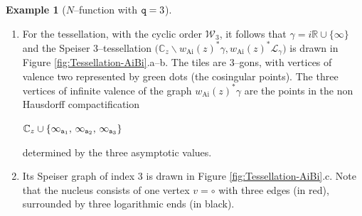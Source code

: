 \documentclass[final,3p,times]{elsarticle}
\newcommand{\CC}{\ensuremath{{\mathbb C}}}
\newcommand{\CW}{\ensuremath{{\widehat{\mathbb C}}}}
\newcommand{\RR}{\ensuremath{{\mathbb R}}}
\newcommand{\R}{\ensuremath{{\mathcal R}}}
\newcommand{\Ai}{{\text{Ai}}}
\theoremstyle{definition}
\newtheorem{example}{Example}[section]
\begin{document}
\begin{example}[$N$--function with ${\tt q}=3$]
\begin{enumerate}[label=\alph*),leftmargin=*]
\noindent
Clearly, we could have chosen different types of sheets in Equation \eqref{eq:eleccion-hojas}; 
for instance by choosing $\mathfrak{L}_3 =  \CW_w \backslash \overline{\infty\, -i}$, 
$\mathfrak{L}_1 = \CW_w \backslash \overline{i\, \infty\, -i}$ and 
$\mathfrak{L}_4 = \CW_w \backslash 
\big( \overline{i\, \infty\, -i} \cup  \overline{i \,  \infty} \cup 
\overline{\infty\, -i} \big)$, 
the decomposition \eqref{eq:decomposicion-dominios-maximales-Ai} into 
maximal domains of single--valuedness would be different.


On the other hand,
considering the cyclic order 

\centerline{$\mathcal{W}_3 = [-i,i,\infty]$,}

\noindent
the decomposition of $\R_{w_\Ai(z)}$ into ${\tt p}=3$
maximal logarithmic towers 
and the unique soul is 
\begin{equation*}
\R_{w_\Ai(z)} = \Big[
\underbrace{\mathfrak{H}^+\backslash \big( \overline{-i \, i} \cup  \overline{i \, \infty} \cup 
\overline{\infty \, -i} \big) }_{\text{soul}}
\ \cup
\underbrace{ \mathcal{T}^\times_- (-i,i) }_{\text{logarithmic tower}}
\cup
\underbrace{ \mathcal{T}^\times_- (i,\infty) }_{\text{logarithmic tower}}
\cup
\underbrace{ \mathcal{T}^\times_- (\infty,-i) }_{\text{logarithmic tower}} 
\Big] \, \Big/ \sim.
\end{equation*}

\item
For the tessellation, with the cyclic order $\mathcal{W}_3$,
it follows that
$\gamma=i\RR\cup\{\infty\}$ and the Speiser $3$--tessellation 
$\big(\CC_z \backslash  w_{\Ai}(z)^*\gamma, 
w_{\Ai}(z)^*\mathcal{L}_\gamma \big)$ is
drawn in Figure \ref{fig:Tessellation-AiBi}.a--b. 
The tiles are $3$--gons, with vertices of valence two represented by green dots 
(the cosingular points). 
The three vertices of infinite valence of 
the graph $w_{\Ai}(z)^*\gamma$
are the points in the non Hausdorff compactification 

\centerline{$\CC_z \cup \{ 
\infty_{{\tt a}_1}, \, 
\infty_{{\tt a}_2}, \,
\infty_{{\tt a}_3}
\}$}

\noindent 
determined by the three asymptotic values. 

\item
Its Speiser graph of index $3$ is drawn in
Figure \ref{fig:Tessellation-AiBi}.c. 
Note that the nucleus consists of one vertex $v=\circ$ with 
three edges (in red), surrounded by three logarithmic ends (in black).


\end{enumerate}
\end{example}
\end{document}
